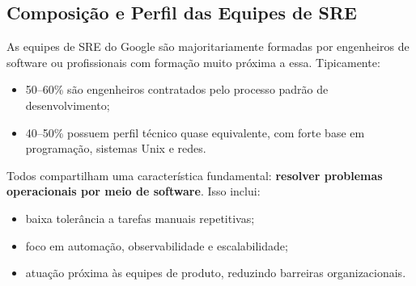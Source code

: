 \documentclass[12pt,a4paper,twoside]{report}
\begin{document}

\subsection{Composição e Perfil das Equipes de SRE}

As equipes de SRE do Google são majoritariamente formadas por engenheiros de
software ou profissionais com formação muito próxima a essa. Tipicamente:
\begin{itemize}[nosep]
    \item 50--60\% são engenheiros contratados pelo processo padrão de
    desenvolvimento;
    \item 40--50\% possuem perfil técnico quase equivalente, com forte base
    em programação, sistemas Unix e redes.
\end{itemize}

Todos compartilham uma característica fundamental: \textbf{resolver problemas
operacionais por meio de software}. Isso inclui:
\begin{itemize}[nosep]
    \item baixa tolerância a tarefas manuais repetitivas;
    \item foco em automação, observabilidade e escalabilidade;
    \item atuação próxima às equipes de produto, reduzindo barreiras
    organizacionais.
\end{itemize}
\end{document}

